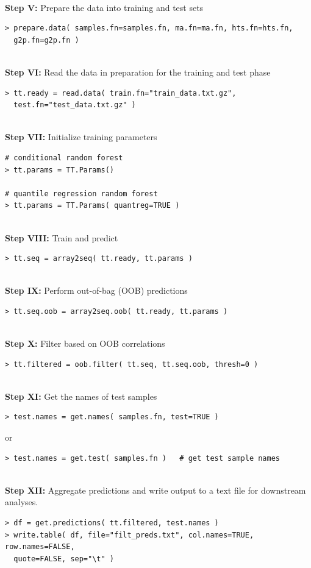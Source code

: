 \documentclass[a4paper,12pt]{article}
\begin{document}
\noindent\\
\textbf{Step V:} Prepare the data into training and test sets
\begin{verbatim}
> prepare.data( samples.fn=samples.fn, ma.fn=ma.fn, hts.fn=hts.fn, 
  g2p.fn=g2p.fn )
\end{verbatim}

\noindent\\
\textbf{Step VI:} Read the data in preparation for the training and test phase
\begin{verbatim}
> tt.ready = read.data( train.fn="train_data.txt.gz", 
  test.fn="test_data.txt.gz" )
\end{verbatim}

\noindent\\
\textbf{Step VII:} Initialize training parameters
\begin{verbatim}
# conditional random forest
> tt.params = TT.Params()

# quantile regression random forest
> tt.params = TT.Params( quantreg=TRUE )
\end{verbatim}

\noindent\\
\textbf{Step VIII:} Train and predict
\begin{verbatim}
> tt.seq = array2seq( tt.ready, tt.params )
\end{verbatim}

\noindent\\
\textbf{Step IX:} Perform out-of-bag (OOB) predictions
\begin{verbatim}
> tt.seq.oob = array2seq.oob( tt.ready, tt.params )
\end{verbatim}

\noindent\\
\textbf{Step X:} Filter based on OOB correlations
\begin{verbatim}
> tt.filtered = oob.filter( tt.seq, tt.seq.oob, thresh=0 )
\end{verbatim}

\noindent\\
\textbf{Step XI:} Get the names of test samples
\begin{verbatim}
> test.names = get.names( samples.fn, test=TRUE )
\end{verbatim}
or 
\begin{verbatim}
> test.names = get.test( samples.fn )   # get test sample names
\end{verbatim}

\noindent\\
\textbf{Step XII:} Aggregate predictions and write output to a text file for downstream analyses.
\begin{verbatim}
> df = get.predictions( tt.filtered, test.names )
> write.table( df, file="filt_preds.txt", col.names=TRUE, row.names=FALSE, 
  quote=FALSE, sep="\t" )
\end{verbatim}
\end{document}
